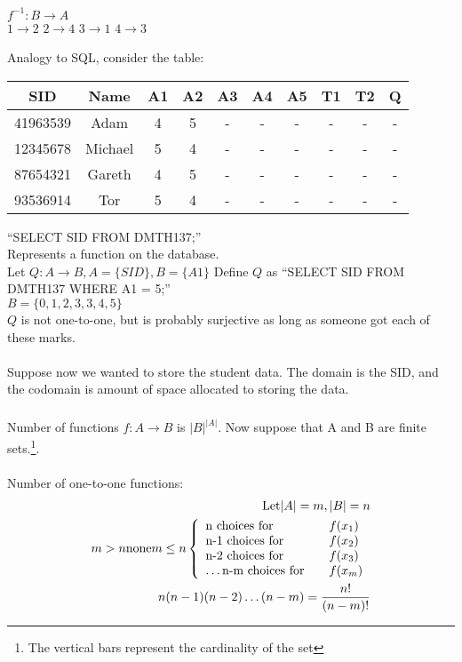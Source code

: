 $f^{-1}: B \to A$ \\
$1 \to 2$
$2 \to 4$
$3 \to 1$
$4 \to 3$

Analogy to SQL, consider the table: \\
\begin{table}[!htb]
\begin{tabularx}{\linewidth}{| c c c c c c c c c c |}
\hline
  SID      & Name    & A1 & A2 & A3 & A4 & A5 & T1 & T2 & Q \\
\hline
  41963539 & Adam    &  4 &  5 &  - &  - &  - &  - &  - & - \\
  12345678 & Michael &  5 &  4 &  - &  - &  - &  - &  - & - \\
  87654321 & Gareth  &  4 &  5 &  - &  - &  - &  - &  - & - \\
  93536914 & Tor     &  5 &  4 &  - &  - &  - &  - &  - & - \\
\hline
\end{tabularx}
\end{table}
``SELECT SID FROM DMTH137;'' \\
Represents a function on the database.\\
Let $Q:A \to B,  A = \{SID\}, B=\{A1\}$
Define $Q$ as ``SELECT SID FROM DMTH137 WHERE A1 = 5;'' \\
$B = \{0,1,2,3,3,4,5\}$ \\
$Q$ is not one-to-one, but is probably surjective as long as someone got each
of these marks. \\
\\
Suppose now we wanted to store the student data. The domain is the SID, and
the codomain is amount of space allocated to storing the data.\\

\subsubsection{}
Number of functions $f: A \to B$ is $|B|^{|A|}$. Now suppose that A and B are
finite sets.\footnote{The vertical bars represent the cardinality of the set}.\\
\\
Number of one-to-one functions:
\begin{align}
  \text{Let} |A| = m, |B| = n \\
  m > n \text{none}
  m \leq n \left\{
    \begin{array}{l l}
      \text{n choices for} & \quad f(x_1) \\
      \text{n-1 choices for} & \quad f(x_2) \\
      \text{n-2 choices for} & \quad f(x_3) \\
      \ldots
      \text{n-m choices for} & \quad f(x_m) \\
    \end{array}
    \right. \\
  n(n-1)(n-2)\ldots(n-m) = \frac{n!}{(n-m)!}
\end{align}

